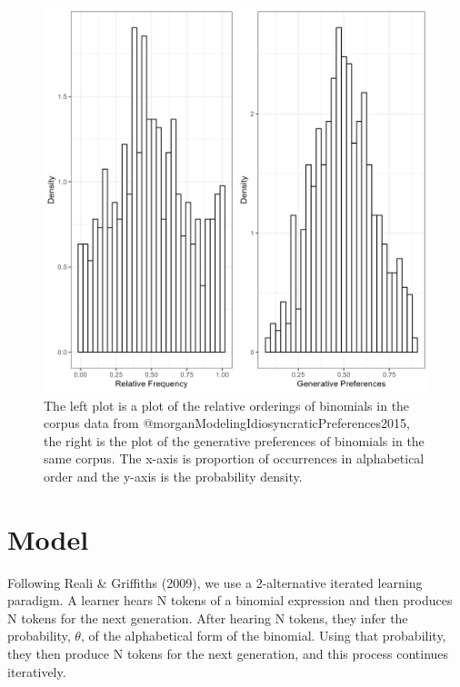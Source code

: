 \documentclass[10pt, letterpaper]{article}
\newenvironment{CodeChunk}{}{}
\begin{document}
\begin{CodeChunk}
\begin{figure}[tb]

{\centering \includegraphics[width=1\linewidth]{Figures/corpus_plots} 

}

\caption[The left plot is a plot of the relative orderings of binomials in the corpus data from @morganModelingIdiosyncraticPreferences2015, the right is the plot of the generative preferences of binomials in the same corpus]{The left plot is a plot of the relative orderings of binomials in the corpus data from @morganModelingIdiosyncraticPreferences2015, the right is the plot of the generative preferences of binomials in the same corpus. The x-axis is proportion of occurrences in alphabetical order and the y-axis is the probability density.}\label{fig:corpusplot1}
\end{figure}
\end{CodeChunk}

\hypertarget{model}{%
\section{Model}\label{model}}

Following Reali \& Griffiths (2009), we use a 2-alternative iterated
learning paradigm. A learner hears N tokens of a binomial expression and
then produces N tokens for the next generation. After hearing N tokens,
they infer the probability, \(\theta\), of the alphabetical form of the
binomial. Using that probability, they then produce N tokens for the
next generation, and this process continues iteratively.
\end{document}
